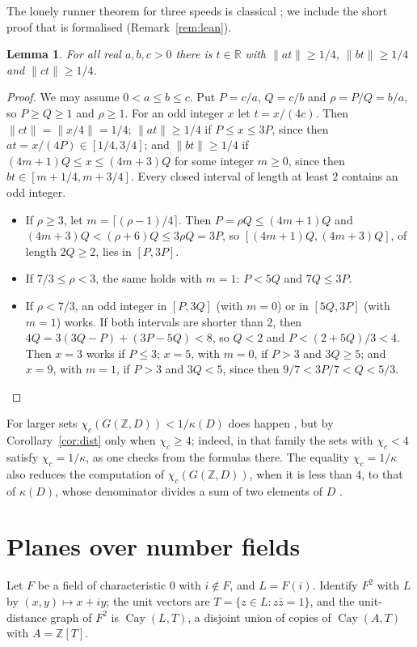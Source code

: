 \documentclass[11pt,a4paper]{amsart}
\newtheorem{lemma}[theorem]{Lemma}
\theoremstyle{definition}
\newcommand{\R}{\mathbb{R}}
\newcommand{\Z}{\mathbb{Z}}
\newcommand{\Cay}{\operatorname{Cay}}
\begin{document}
The lonely runner theorem for three speeds is classical \cite{BW,Cusick}; we include the short proof that is
formalised (Remark~\ref{rem:lean}).

\begin{lemma}\label{lem:lr3}
For all real $a,b,c>0$ there is $t\in\R$ with $\|at\|\ge1/4$, $\|bt\|\ge1/4$ and $\|ct\|\ge1/4$.
\end{lemma}

\begin{proof}
We may assume $0<a\le b\le c$. Put $P=c/a$, $Q=c/b$ and $\rho=P/Q=b/a$, so $P\ge Q\ge1$ and $\rho\ge1$. For an
odd integer $x$ let $t=x/(4c)$. Then $\|ct\|=\|x/4\|=1/4$; $\|at\|\ge1/4$ if $P\le x\le3P$, since then
$at=x/(4P)\in[1/4,3/4]$; and $\|bt\|\ge1/4$ if $(4m+1)Q\le x\le(4m+3)Q$ for some integer $m\ge0$, since then
$bt\in[m+1/4,m+3/4]$. Every closed interval of length at least $2$ contains an odd integer.
\begin{itemize}
\item If $\rho\ge3$, let $m=\lceil(\rho-1)/4\rceil$. Then $P=\rho Q\le(4m+1)Q$ and $(4m+3)Q<(\rho+6)Q\le3\rho Q=3P$,
so $[(4m+1)Q,(4m+3)Q]$, of length $2Q\ge2$, lies in $[P,3P]$.
\item If $7/3\le\rho<3$, the same holds with $m=1$: $P<5Q$ and $7Q\le3P$.
\item If $\rho<7/3$, an odd integer in $[P,3Q]$ (with $m=0$) or in $[5Q,3P]$ (with $m=1$) works. If both intervals
are shorter than $2$, then $4Q=3(3Q-P)+(3P-5Q)<8$, so $Q<2$ and $P<(2+5Q)/3<4$. Then $x=3$ works if $P\le3$;
$x=5$, with $m=0$, if $P>3$ and $3Q\ge5$; and $x=9$, with $m=1$, if $P>3$ and $3Q<5$, since then
$9/7<3P/7<Q<5/3$. \qedhere
\end{itemize}
\end{proof}

For larger sets $\chi_c(G(\Z,D))<1/\kappa(D)$ does happen \cite[Theorems~17 and~18]{Liu}, but by
Corollary~\ref{cor:dist} only when $\chi_c\ge4$; indeed, in that family the sets with $\chi_c<4$ satisfy
$\chi_c=1/\kappa$, as one checks from the formulas there. The equality $\chi_c=1/\kappa$ also reduces the
computation of $\chi_c(G(\Z,D))$, when it is less than $4$, to that of $\kappa(D)$, whose denominator divides a sum
of two elements of $D$ \cite{Liu}.

\section{Planes over number fields}\label{sec:planes}

Let $F$ be a field of characteristic $0$ with $i\notin F$, and $L=F(i)$. Identify $F^2$ with $L$ by
$(x,y)\mapsto x+iy$; the unit vectors are $T=\{z\in L: z\bar z=1\}$, and the unit-distance graph of $F^2$ is
$\Cay(L,T)$, a disjoint union of copies of $\Cay(A,T)$ with $A=\Z[T]$.
\end{document}
